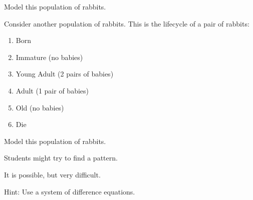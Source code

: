 	Model this population of rabbits.
	
	


\bookonlynewpage


\question
	Consider another population of rabbits. This is the lifecycle of a pair of rabbits:
	\begin{enumerate}[label=(year \arabic*)]
		\item Born
		\item Immature (no babies)
		\item Young Adult (2 pairs of babies)
		\item Adult (1 pair of babies)
		\item Old (no babies)
		\item Die
	\end{enumerate}	
	
	Model this population of rabbits.
	
\begin{annotation}
	\begin{goals}
		Students might try to find a pattern. 
		
		It is possible, but very difficult.
		
		Hint: Use a system of difference equations.
	\end{goals}
\end{annotation}
	


%
%
%
%
%
%
%
%	
%	
%
%
%
%
%	
%
%
%
%
%
%
%
%
%




